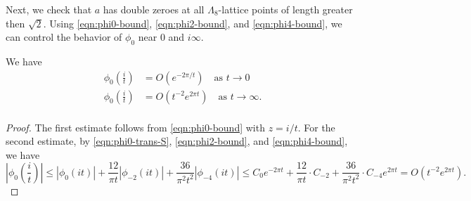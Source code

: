 Next, we check that $a$ has double zeroes at all $\Lambda_8$-lattice points of length greater then $\sqrt{2}$.
Using \eqref{eqn:phi0-bound}, \eqref{eqn:phi2-bound}, and \eqref{eqn:phi4-bound}, we can control the behavior of $\phi_0$ near $0$ and $i\infty$.

\begin{corollary}\label{cor:phi0-near-0-infty}
We have
\begin{align}
    \phi_0\left(\frac{i}{t}\right) &= O(e^{-2 \pi / t}) \quad \text{as } t \to 0 \label{eqn:phi0-near-0} \\
    \phi_0\left(\frac{i}{t}\right) &= O(t^{-2}e^{2 \pi t}) \quad \text{as } t \to \infty. \label{eqn:phi0-near-infty} \\
\end{align}
\end{corollary}
\begin{proof}
The first estimate follows from \eqref{eqn:phi0-bound} with $z = i/t$.
For the second estimate, by \eqref{eqn:phi0-trans-S}, \eqref{eqn:phi2-bound}, and \eqref{eqn:phi4-bound}, we have
\begin{equation}
    \left|\phi_0\left(\frac{i}{t}\right)\right| \le |\phi_0(it)| + \frac{12}{\pi t} |\phi_{-2}(it)| + \frac{36}{\pi^2 t^2} |\phi_{-4}(it)|
    \le C_0 e^{-2 \pi t} + \frac{12}{\pi t} \cdot C_{-2} + \frac{36}{\pi^2 t^2} \cdot C_{-4} e^{2 \pi t} = O(t^{-2}e^{2 \pi t}).
\end{equation}
\end{proof}

